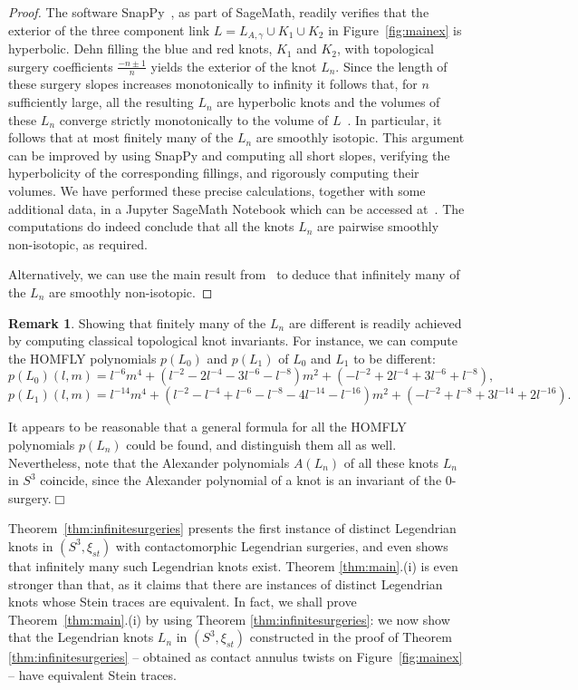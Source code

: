 \documentclass[11pt]{amsart} %
\theoremstyle{plain}
\theoremstyle{definition}
\newtheorem{rem}[Theorem]{Remark}
\begin{document}
\begin{proof}
The software SnapPy~\cite{CullerDunfieldGoernerWeeks}, as part of SageMath, readily verifies that the exterior of the three component link $L=L_{A,\gamma}\cup K_1\cup K_2$ in Figure~\ref{fig:mainex} is hyperbolic. Dehn filling the blue and red knots, $K_1$ and $K_2$, with topological surgery coefficients $\frac{-n \pm1}{n}$ yields the exterior of the knot $L_n$. Since the length of these surgery slopes increases monotonically to infinity it follows that, for $n$ sufficiently large, all the resulting $L_n$ are hyperbolic knots and the volumes of these $L_n$ converge strictly monotonically to the volume of $L$~\cite{NeumannZagier85, Thurston80}. In particular, it follows that at most finitely many of the $L_n$ are smoothly isotopic. This argument can be improved by using SnapPy and computing all short slopes, verifying the hyperbolicity of the corresponding fillings, and rigorously computing their volumes. We have performed these precise calculations, together with some additional data, in a Jupyter SageMath Notebook which can be accessed at~\cite{CasalsEtnyreKegel}. The computations do indeed conclude that all the knots $L_n$ are pairwise smoothly non-isotopic, as required. 

Alternatively, we can use the main result from~\cite{BakerGordonLuecke16} to deduce that infinitely many of the $L_n$ are smoothly non-isotopic.
\end{proof}

\begin{rem}
Showing that finitely many of the $L_n$ are different is readily achieved by computing classical topological knot invariants. For instance, we can compute the HOMFLY polynomials $p(L_0)$ and $p(L_1)$ of $L_0$ and $L_1$ to be different:
$$
p(L_0)(l,m)=l^{-6}m^4 + (l^{-2} - 2l^{-4} - 3l^{-6} - l^{-8})m^2 + (-l^{-2} + 2l^{-4} + 3l^{-6} + l^{-8}),$$
$$p(L_1)(l,m)=l^{-14}m^4 + (l^{-2} - l^{-4} + l^{-6} - l^{-8} - 4l^{-14} - l^{-16})m^2 + (-l^{-2} + l^{-8} + 3l^{-14} + 2l^{-16}).$$

It appears to be reasonable that a general formula for all the HOMFLY polynomials $p(L_n)$ could be found, and distinguish them all as well. Nevertheless, note that the Alexander polynomials $A(L_n)$ of all these knots $L_n$ in $S^3$ coincide, since the Alexander polynomial of a knot is an invariant of the $0$-surgery.\hfill$\Box$
\end{rem}

Theorem~\ref{thm:infinitesurgeries} presents the first instance of distinct Legendrian knots in $(S^3,\xi_{st})$ with contactomorphic Legendrian surgeries, and even shows that infinitely many such Legendrian knots exist. Theorem \ref{thm:main}.(i) is even stronger than that, as it claims that there are instances of distinct Legendrian knots whose Stein traces are equivalent. In fact, we shall prove Theorem~\ref{thm:main}.(i) by using Theorem \ref{thm:infinitesurgeries}: we now show that the Legendrian knots $L_n$ in $(S^3,\xi_{st})$ constructed in the proof of Theorem \ref{thm:infinitesurgeries} -- obtained as contact annulus twists on Figure~\ref{fig:mainex} -- have equivalent Stein traces.
\end{document}
